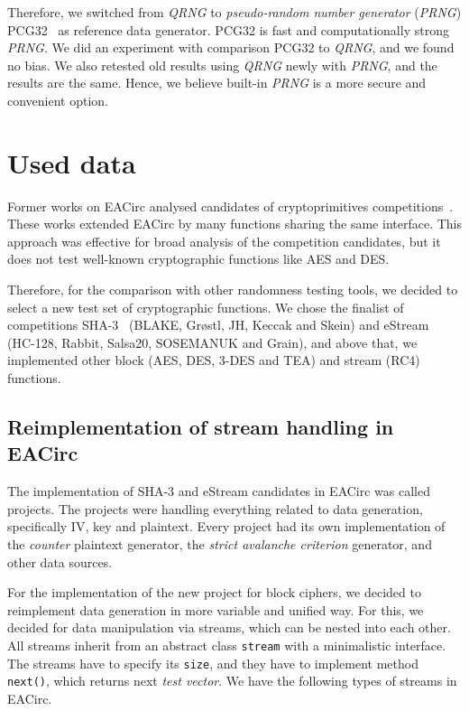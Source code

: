 \documentclass[
    digital,    %
    oneside,    %
    color,
    11pt,
    nocover,
    notable,
    nolof,
    nolot,
]{fithesis3}
\begin{document}
Therefore, we switched from \textit{QRNG} to \textit{pseudo-random number generator} (\textit{PRNG}) PCG32~\cite{pcgGen} as reference data generator. PCG32 is fast and computationally strong \textit{PRNG}. We did an experiment with comparison PCG32 to \textit{QRNG}, and we found no bias. We also retested old results using \textit{QRNG} newly with \textit{PRNG}, and the results are the same. Hence, we believe built-in \textit{PRNG} is a more secure and convenient option.

\section{Used data}
\label{sec:method-data}

Former works on EACirc analysed candidates of cryptoprimitives competitions~\cite{estreamMgrThesis,sha3Thesis,ukropMgrThesis}. These works extended EACirc by many functions sharing the same interface. This approach was effective for broad analysis of the competition candidates, but it does not test well-known cryptographic functions like AES and DES.

Therefore, for the comparison with other randomness testing tools, we decided to select a new test set of cryptographic functions. We chose the finalist of competitions SHA-3~\cite{sha3-competition} (BLAKE, Gr\o stl, JH, Keccak and Skein) and eStream~\cite{estream-competition} (HC-128, Rabbit, Salsa20, SOSEMANUK and Grain), and above that, we implemented other block (AES, DES, 3-DES and TEA) and stream (RC4) functions.

\subsection{Reimplementation of stream handling in EACirc}
\label{subsec:method-data-streams}

The implementation of SHA-3 and eStream candidates in EACirc was called projects. The projects were handling everything related to data generation, specifically IV, key and plaintext. Every project had its own implementation of the \textit{counter} plaintext generator, the \textit{strict avalanche criterion} generator, and other data sources.

For the implementation of the new project for block ciphers, we decided to reimplement data generation in more variable and unified way. For this, we decided for data manipulation via streams, which can be nested into each other. All streams inherit from an abstract class \texttt{stream} with a minimalistic interface. The streams have to specify its \texttt{size}, and they have to implement method \texttt{next()}, which returns next \textit{test vector}. We have the following types of streams in EACirc.
\end{document}
